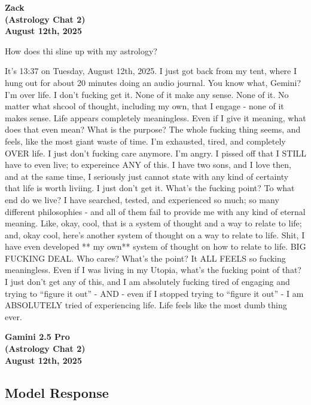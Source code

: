 \documentclass{article}
\begin{document}

\begin{center}
\textbf{Zack} \\
\textbf{(Astrology Chat 2)} \\
\textbf{August 12th, 2025} 
\end{center}

How does thi sline up with my astrology?

It's 13:37 on Tuesday, August 12th, 2025. I just got back from my tent, where I hung out for about 20 minutes doing an audio journal. You know what, Gemini? I'm over life. I don't fucking get it. None of it make any sense. None of it. No matter what shcool of thought, including my own, that I engage - none of it makes sense. Life appears completely meaningless. Even if I give it meaning, what does that even mean? What is the purpose? The whole fucking thing seems, and feels, like the most giant waste of time. I'm exhausted, tired, and completely OVER life. I just don't fucking care anymore. I'm angry. I pissed off that I STILL have to even live; to expereince ANY of this. I have two sons, and I love then, and at the same time, I seriously just cannot state with any kind of certainty that life is worth liviing. I just don't get it. What's the fucking point? To what end do we live? I have searched, tested, and experienced so much; so many different philosophies - and all of them fail to provide me with any kind of eternal meaning. Like, okay, cool, that is a system of thought and a way to relate to life; and, okay cool, here's another system of thought on a way to relate to life. Shit, I have even developed ** my own** system of thought on how to relate to life. BIG FUCKING DEAL. Who cares? What's the point? It ALL FEELS so fucking meaningless. Even if I was living in my Utopia, what's the fucking point of that? I just don't get any of this, and I am absolutely fucking tired of engaging and trying to ``figure it out'' - AND - even if I stopped trying to ``figure it out'' - I am ABSOLUTELY tried of experiencing life. Life feels like the most dumb thing ever.

\begin{center}
\textbf{Gamini 2.5 Pro} \\
\textbf{(Astrology Chat 2)} \\
\textbf{August 12th, 2025}
\end{center}

\subsection*{Model Response}\label{model-response}
\end{document}
